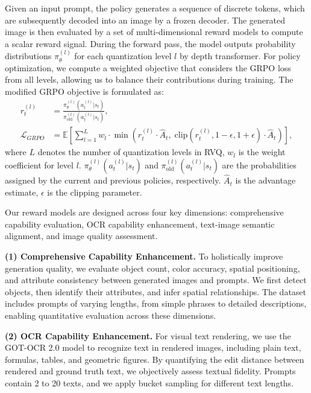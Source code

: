 \documentclass{article}
\begin{document}
Given an input prompt, the policy generates a sequence of discrete tokens, which are subsequently decoded into an image by a frozen decoder. The generated image is then evaluated by a set of multi-dimensional reward models to compute a scalar reward signal. 
During the forward pass, the model outputs probability distributions $\pi_\theta^{(l)}$ for each quantization level $l$ by depth transformer. For policy optimization, we compute a weighted objective that considers the GRPO loss from all levels, allowing us to balance their contributions during training. 
The modified GRPO objective is formulated as:
\begin{align}
r_t^{(l)} &= \frac{\pi_\theta^{(l)}(a_t^{(l)}|s_t)}{\pi_{\text{old}}^{(l)}(a_t^{(l)}|s_t)}, \\
\mathcal{L}_{GRPO} &= \mathbb{E} \left[ \sum_{l=1}^{L} w_l \cdot
    \min \left(
        r_t^{(l)} \cdot \hat{A}_t,\;
        \mathrm{clip}(r_t^{(l)}, 1-\epsilon, 1+\epsilon) \cdot \hat{A}_t
    \right)
\right],
\end{align}
where $L$ denotes the number of quantization levels in RVQ, $w_l$ is the weight coefficient for level $l$.  $\pi_\theta^{(l)}(a_t^{(l)}|s_t)$ and $\pi_{\text{old}}^{(l)}(a_t^{(l)}|s_t)$ are the probabilities assigned by the current and previous policies, respectively. $\hat{A}_t$ is the advantage estimate, $\epsilon$ is the clipping parameter. 

Our reward models are designed across four key dimensions: comprehensive capability evaluation, OCR capability enhancement, text-image semantic alignment, and image quality assessment. 

\textbf{(1) Comprehensive Capability Enhancement. }
To holistically improve generation quality, we evaluate object count, color accuracy, spatial positioning, and attribute consistency between generated images and prompts. We first detect objects, then identify their attributes, and infer spatial relationships. The dataset includes prompts of varying lengths, from simple phrases to detailed descriptions, enabling quantitative evaluation across these dimensions.

\textbf{(2) OCR Capability Enhancement.} For visual text rendering, we use the GOT-OCR 2.0 \cite{wu2023human} model to recognize text in rendered images, including plain text, formulas, tables, and geometric figures. By quantifying the edit distance between rendered and ground truth text, we objectively assess textual fidelity. Prompts contain 2 to 20 texts, and we apply bucket sampling for different text lengths. 
\end{document}
